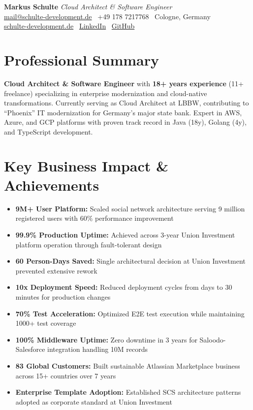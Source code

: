 \documentclass[10pt,a4paper]{article}
\begin{document}
{\Huge\bfseries\sffamily Markus Schulte} \hfill \textit{Cloud Architect \& Software Engineer}\\[4pt]
\href{mailto:mail@schulte-development.de}{mail@schulte-development.de} \textbullet\ 
+49 178 7217768 \textbullet\ 
Cologne, Germany\\
\href{https://schulte-development.de}{schulte-development.de} \textbullet\ 
\href{https://linkedin.com/in/markus-schulte}{LinkedIn} \textbullet\ 
\href{https://github.com/SchulteDev}{GitHub}

\section{Professional Summary}

\textbf{Cloud Architect \& Software Engineer} with \textbf{18+ years experience} (11+ freelance) specializing in enterprise modernization and cloud-native transformations. Currently serving as Cloud Architect at LBBW, contributing to ``Phoenix'' IT modernization for Germany's major state bank. Expert in AWS, Azure, and GCP platforms with proven track record in Java (18y), Golang (4y), and TypeScript development.

\section{Key Business Impact \& Achievements}

\begin{itemize}[leftmargin=15pt]
\item \textbf{9M+ User Platform:} Scaled social network architecture serving 9 million registered users with 60\% performance improvement
\item \textbf{99.9\% Production Uptime:} Achieved across 3-year Union Investment platform operation through fault-tolerant design
\item \textbf{60 Person-Days Saved:} Single architectural decision at Union Investment prevented extensive rework
\item \textbf{10x Deployment Speed:} Reduced deployment cycles from days to 30 minutes for production changes
\item \textbf{70\% Test Acceleration:} Optimized E2E test execution while maintaining 1000+ test coverage
\item \textbf{100\% Middleware Uptime:} Zero downtime in 3 years for Saloodo-Salesforce integration handling 10M records
\item \textbf{83 Global Customers:} Built sustainable Atlassian Marketplace business across 15+ countries over 7 years
\item \textbf{Enterprise Template Adoption:} Established SCS architecture patterns adopted as corporate standard at Union Investment
\end{itemize}
\end{document}
